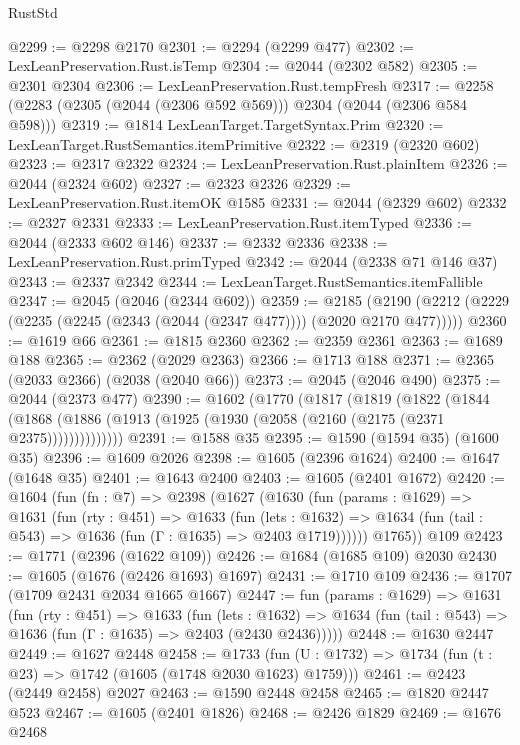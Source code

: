 \begin{lexlean}{RustStd}
\begin{coremodule}
@2299 := @2298 @2170
@2301 := @2294 (@2299 @477)
@2302 := LexLeanPreservation.Rust.isTemp
@2304 := @2044 (@2302 @582)
@2305 := @2301 @2304
@2306 := LexLeanPreservation.Rust.tempFresh
@2317 := @2258 (@2283 (@2305 (@2044 (@2306 @592 @569))) @2304 (@2044 (@2306 @584 @598)))
@2319 := @1814 LexLeanTarget.TargetSyntax.Prim
@2320 := LexLeanTarget.RustSemantics.itemPrimitive
@2322 := @2319 (@2320 @602)
@2323 := @2317 @2322
@2324 := LexLeanPreservation.Rust.plainItem
@2326 := @2044 (@2324 @602)
@2327 := @2323 @2326
@2329 := LexLeanPreservation.Rust.itemOK @1585
@2331 := @2044 (@2329 @602)
@2332 := @2327 @2331
@2333 := LexLeanPreservation.Rust.itemTyped
@2336 := @2044 (@2333 @602 @146)
@2337 := @2332 @2336
@2338 := LexLeanPreservation.Rust.primTyped
@2342 := @2044 (@2338 @71 @146 @37)
@2343 := @2337 @2342
@2344 := LexLeanTarget.RustSemantics.itemFallible
@2347 := @2045 (@2046 (@2344 @602))
@2359 := @2185
    (@2190 (@2212 (@2229 (@2235 (@2245 (@2343 (@2044 (@2347 @477)))) (@2020 @2170 @477)))))
@2360 := @1619 @66
@2361 := @1815 @2360
@2362 := @2359 @2361
@2363 := @1689 @188
@2365 := @2362 (@2029 @2363)
@2366 := @1713 @188
@2371 := @2365 (@2033 @2366) (@2038 (@2040 @66))
@2373 := @2045 (@2046 @490)
@2375 := @2044 (@2373 @477)
@2390 := @1602
    (@1770
      (@1817
        (@1819
          (@1822
            (@1844
              (@1868 (@1886 (@1913 (@1925 (@1930 (@2058 (@2160 (@2175 (@2371 @2375))))))))))))))
@2391 := @1588 @35
@2395 := @1590 (@1594 @35) (@1600 @35)
@2396 := @1609 @2026
@2398 := @1605 (@2396 @1624)
@2400 := @1647 (@1648 @35)
@2401 := @1643 @2400
@2403 := @1605 (@2401 @1672)
@2420 := @1604
    (fun (fn : @7) =>
    @2398
      (@1627
        (@1630
          (fun (params : @1629) =>
          @1631
            (fun (rty : @451) =>
            @1633
              (fun (lets : @1632) =>
              @1634 (fun (tail : @543) => @1636 (fun (Γ : @1635) => @2403 @1719))))))
        @1765))
    @109
@2423 := @1771 (@2396 (@1622 @109))
@2426 := @1684 (@1685 @109) @2030
@2430 := @1605 (@1676 (@2426 @1693) @1697)
@2431 := @1710 @109
@2436 := @1707 (@1709 @2431 @2034 @1665 @1667)
@2447 := fun (params : @1629) =>
  @1631
    (fun (rty : @451) =>
    @1633
      (fun (lets : @1632) =>
      @1634 (fun (tail : @543) => @1636 (fun (Γ : @1635) => @2403 (@2430 @2436)))))
@2448 := @1630 @2447
@2449 := @1627 @2448
@2458 := @1733 (fun (U : @1732) => @1734 (fun (t : @23) => @1742 (@1605 (@1748 @2030 @1623) @1759)))
@2461 := @2423 (@2449 @2458) @2027
@2463 := @1590 @2448 @2458
@2465 := @1820 @2447 @523
@2467 := @1605 (@2401 @1826)
@2468 := @2426 @1829
@2469 := @1676 @2468

\end{coremodule}
\end{lexlean}
